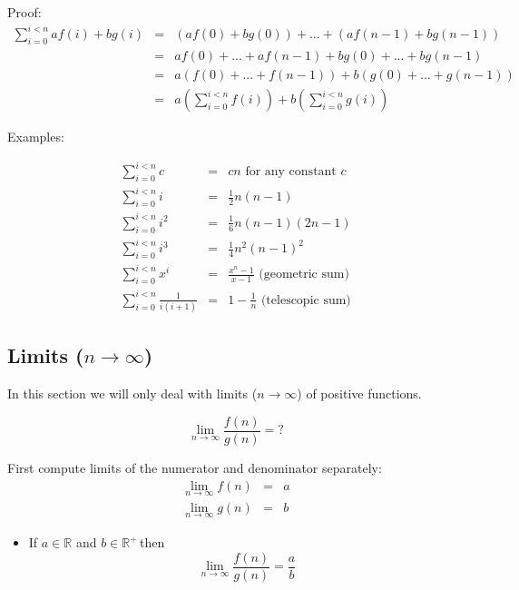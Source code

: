 \documentclass[justified, sixbynine]{tufte-book}
\theoremstyle{plain}%
\newtheorem * {corollary}{Corollary}
\theoremstyle{definition}
\theoremstyle{remark}
\newtheorem * {remark}{Remark}
\newtheorem * {note}{Note}
\begin{document}
\begin{fullwidth}
Proof:
\begin{eqnarray}
\sum_{i=0}^{i<n}af(i)+bg(i) &=&\left( af(0)+bg(0)\right) +...+\left(
af(n-1)+bg(n-1)\right)  \nonumber \\
&=&af(0)+...+af(n-1)+bg(0)+...+bg(n-1)  \nonumber \\
&=&a\left( f(0)+...+f(n-1)\right) +b\left( g(0)+...+g(n-1)\right)  \nonumber
\\
&=&a\left( \sum_{i=0}^{i<n}f(i)\right) +b\left( \sum_{i=0}^{i<n}g(i)\right)
\end{eqnarray}

Examples:

\begin{eqnarray}
\sum_{i=0}^{i<n}c &=&cn\text{ for any constant }c \\
\sum_{i=0}^{i<n}i &=&\frac 12n(n-1) \\
\sum_{i=0}^{i<n}i^2 &=&\frac 16n(n-1)(2n-1) \\
\sum_{i=0}^{i<n}i^3 &=&\frac 14n^2(n-1)^2 \\
\sum_{i=0}^{i<n}x^i &=&\frac{x^n-1}{x-1}\text{ (geometric sum)} \\
\sum_{i=0}^{i<n}\frac 1{i(i+1)} &=&1-\frac 1n\text{ (telescopic sum)}
\end{eqnarray}


\goodbreak\subsection{Limits ($n\rightarrow \infty $)}

In this section we will only deal with limits ($n\rightarrow \infty $) of
positive functions.

\begin{equation}
\lim_{n\rightarrow \infty }\frac{f(n)}{g(n)}=?
\end{equation}

First compute limits of the numerator and denominator separately:
\begin{eqnarray}
\lim_{n\rightarrow \infty }f(n) &=&a \\
\lim_{n\rightarrow \infty }g(n) &=&b
\end{eqnarray}

\begin{itemize}
\item  If $a\in \mathbb{R}$ and $b\in \mathbb{R}^{+}\, $then
\begin{equation}
\lim_{n\rightarrow \infty }\frac{f(n)}{g(n)}=\frac ab
\end{equation}


\end{itemize}
\end{fullwidth}
\end{document}
